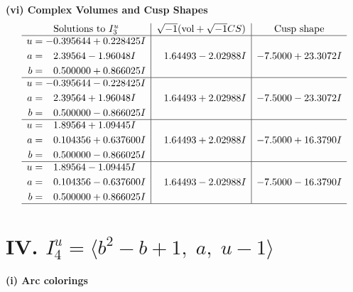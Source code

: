 \documentclass[1p]{elsarticle_modified}
\theoremstyle{definition}
\newcommand{\I}{\sqrt{-1}}
\begin{document}
\newpage\flushleft \textbf{(vi) Complex Volumes and Cusp Shapes}
$$\begin{array}{c|c|c}  
\text{Solutions to }I^u_{3}& \I (\text{vol} + \sqrt{-1}CS) & \text{Cusp shape}\\
 \hline 
\begin{aligned}
u &= -0.395644 + 0.228425 I \\
a &= \phantom{-}2.39564 - 1.96048 I \\
b &= \phantom{-}0.500000 + 0.866025 I\end{aligned}
 & \phantom{-}1.64493 - 2.02988 I & -7.5000 + 23.3072 I \\ \hline\begin{aligned}
u &= -0.395644 - 0.228425 I \\
a &= \phantom{-}2.39564 + 1.96048 I \\
b &= \phantom{-}0.500000 - 0.866025 I\end{aligned}
 & \phantom{-}1.64493 + 2.02988 I & -7.5000 - 23.3072 I \\ \hline\begin{aligned}
u &= \phantom{-}1.89564 + 1.09445 I \\
a &= \phantom{-}0.104356 + 0.637600 I \\
b &= \phantom{-}0.500000 - 0.866025 I\end{aligned}
 & \phantom{-}1.64493 + 2.02988 I & -7.5000 + 16.3790 I \\ \hline\begin{aligned}
u &= \phantom{-}1.89564 - 1.09445 I \\
a &= \phantom{-}0.104356 - 0.637600 I \\
b &= \phantom{-}0.500000 + 0.866025 I\end{aligned}
 & \phantom{-}1.64493 - 2.02988 I & -7.5000 - 16.3790 I\\
 \hline 
 \end{array}$$\newpage\newpage\renewcommand{\arraystretch}{1}
\centering \section*{IV. $I^u_{4}= \langle b^2- b+1,\;a,\;u-1 \rangle$}
\flushleft \textbf{(i) Arc colorings}\\
\end{document}
